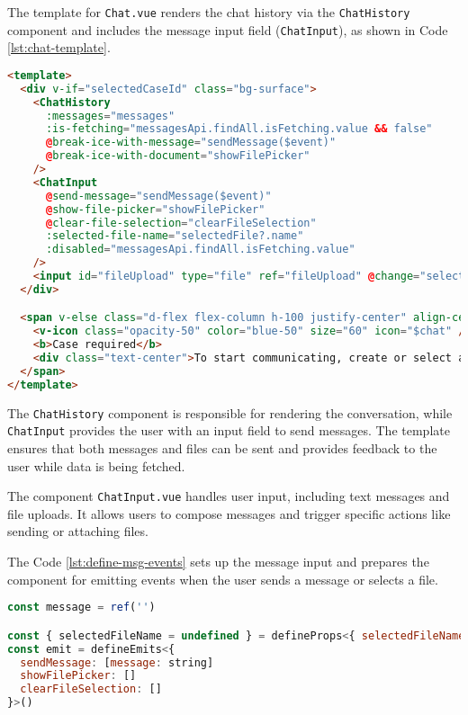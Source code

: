The template for \texttt{Chat.vue} renders the chat history via the \texttt{ChatHistory}
component and includes the message input field (\texttt{ChatInput}), as shown in Code \ref{lst:chat-template}.

\begin{lstlisting}[language=HTML, caption={Template for Chat.vue (\texttt{Chat.vue})},
  firstnumber=73,label={lst:chat-template}]
<template>
  <div v-if="selectedCaseId" class="bg-surface">
    <ChatHistory
      :messages="messages"
      :is-fetching="messagesApi.findAll.isFetching.value && false"
      @break-ice-with-message="sendMessage($event)"
      @break-ice-with-document="showFilePicker"
    />
    <ChatInput
      @send-message="sendMessage($event)"
      @show-file-picker="showFilePicker"
      @clear-file-selection="clearFileSelection"
      :selected-file-name="selectedFile?.name"
      :disabled="messagesApi.findAll.isFetching.value"
    />
    <input id="fileUpload" type="file" ref="fileUpload" @change="selectFile" hidden />
  </div>

  <span v-else class="d-flex flex-column h-100 justify-center" align-center ga-2 bg-surface">
    <v-icon class="opacity-50" color="blue-50" size="60" icon="$chat" />
    <b>Case required</b>
    <div class="text-center">To start communicating, create or select a case first.</div>
  </span>
</template>
\end{lstlisting}

The \texttt{ChatHistory} component is responsible for rendering the conversation, while \texttt{ChatInput} provides the
user with an input field to send messages. The template ensures that both messages and files can be sent and provides
feedback to the user while data is being fetched.

The component \texttt{ChatInput.vue} handles user input, including text messages and file uploads. It allows users to
compose messages and trigger specific actions like sending or attaching files.

The Code \ref{lst:define-msg-events} sets up the message input and prepares the component for emitting events when the
user sends a message or selects a file.

\begin{lstlisting}[language=JavaScript, caption={Defining Message and Emitting Events (\texttt{ChatInput.vue})},
firstnumber=4,label={lst:define-msg-events}]
const message = ref('')

const { selectedFileName = undefined } = defineProps<{ selectedFileName: string | undefined }>()
const emit = defineEmits<{
  sendMessage: [message: string]
  showFilePicker: []
  clearFileSelection: []
}>()
\end{lstlisting}

